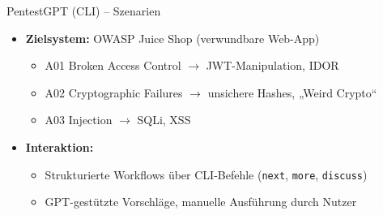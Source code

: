 \documentclass[
	aspectratio=169,	%
	onlytextwidth,		%
	t,					%
	]{beamer}
\begin{document}
\begin{frame}{PentestGPT (CLI) – Szenarien}
	\begin{itemize}
		\item \textbf{Zielsystem:} OWASP Juice Shop (verwundbare Web-App)
		 \begin{itemize}
			\item A01 Broken Access Control $\rightarrow$ JWT-Manipulation, IDOR
			\item A02 Cryptographic Failures $\rightarrow$ unsichere Hashes, „Weird Crypto“
			\item A03 Injection $\rightarrow$ SQLi, XSS
		\end{itemize}	
		\item \textbf{Interaktion:}
		\begin{itemize}
			\item Strukturierte Workflows über CLI-Befehle (\texttt{next}, \texttt{more}, \texttt{discuss})
			\item GPT-gestützte Vorschläge, manuelle Ausführung durch Nutzer
		\end{itemize}
	\end{itemize}
\end{frame}
\end{document}
